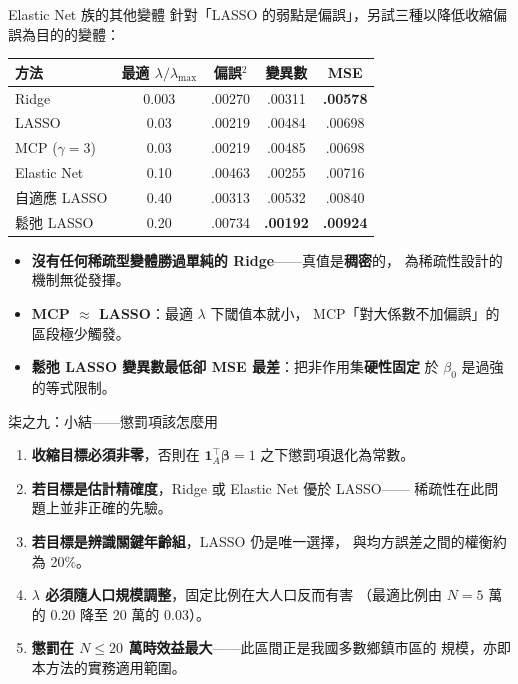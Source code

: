 \documentclass[aspectratio=169, UTF8, fontset=macnew, 11pt]{ctexbeamer}
\newcommand{\hi}[1]{\textcolor{red!70!black}{\textbf{#1}}}
\newcommand{\gd}[1]{\textcolor{green!45!black}{\textbf{#1}}}
\begin{document}
\begin{frame}{Elastic Net 族的其他變體}
針對「LASSO 的弱點是偏誤」，另試三種以降低收縮偏誤為目的的變體：
\vspace{3pt}
\begin{center}\small
\begin{tabular}{lcccc}
\toprule
方法 & 最適 $\lambda/\lambda_{\max}$ & 偏誤$^2$ & 變異數 & MSE\\
\midrule
Ridge & 0.003 & .00270 & .00311 & \gd{.00578}\\
LASSO & 0.03 & .00219 & .00484 & .00698\\
MCP ($\gamma=3$) & 0.03 & .00219 & .00485 & .00698\\
Elastic Net & 0.10 & .00463 & .00255 & .00716\\
自適應 LASSO & 0.40 & .00313 & .00532 & .00840\\
鬆弛 LASSO & 0.20 & .00734 & \gd{.00192} & \hi{.00924}\\
\bottomrule
\end{tabular}
\end{center}
\vspace{4pt}
\begin{itemize}\footnotesize
  \item \hi{沒有任何稀疏型變體勝過單純的 Ridge}——真值是\textbf{稠密}的，
        為稀疏性設計的機制無從發揮。
  \item \textbf{MCP $\approx$ LASSO}：最適 $\lambda$ 下閾值本就小，
        MCP「對大係數不加偏誤」的區段極少觸發。
  \item \textbf{鬆弛 LASSO 變異數最低卻 MSE 最差}：把非作用集\textbf{硬性固定}
        於 $\beta_0$ 是過強的等式限制。
\end{itemize}
\end{frame}

\begin{frame}{柒之九：小結——懲罰項該怎麼用}
\begin{enumerate}\setlength{\itemsep}{9pt}
  \item \textbf{收縮目標必須非零}，否則在 $\mathbf{1}_A^{\!\top}
        \boldsymbol{\beta}=1$ 之下懲罰項退化為常數。
  \item \textbf{若目標是估計精確度}，Ridge 或 Elastic Net 優於 LASSO——
        稀疏性在此問題上並非正確的先驗。
  \item \textbf{若目標是辨識關鍵年齡組}，LASSO 仍是唯一選擇，
        與均方誤差之間的權衡約為 20\%。
  \item \hi{$\lambda$ 必須隨人口規模調整}，固定比例在大人口反而有害
        （最適比例由 $N=5$ 萬的 0.20 降至 20 萬的 0.03）。
  \item \gd{懲罰在 $N\le20$ 萬時效益最大}——此區間正是我國多數鄉鎮市區的
        規模，亦即本方法的實務適用範圍。
\end{enumerate}
\end{frame}
\end{document}
